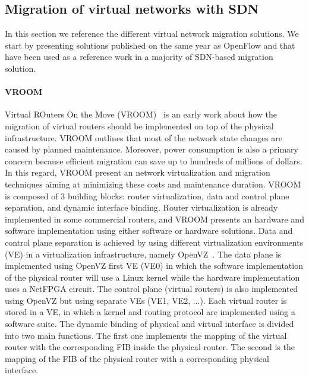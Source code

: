 \subsection{Migration of virtual networks with SDN}
In this section we reference the different virtual network migration solutions.
We start by presenting solutions published on the same year as OpenFlow and that have been used as a reference work in a majority of SDN-based migration solution.

\paragraph{VROOM}
Virtual ROuters On the Move (VROOM)~\cite{VROOM-Wang2008} is an early work about how the migration of virtual routers should be implemented on top of the physical infrastructure. 
VROOM outlines that most of the network state changes are caused by planned maintenance.
Moreover, power consumption is also a primary concern because efficient migration can save up to hundreds of millions of dollars.
In this regard, VROOM present an network virtualization and migration techniques aiming at minimizing these costs and maintenance duration.
VROOM is composed of 3 building blocks: router virtualization, data and control plane separation, and dynamic interface binding.
Router virtualization is already implemented in some commercial routers, and VROOM presents an hardware and software implementation using either software or hardware solutions.
Data and control plane separation is achieved by using different virtualization environments (VE) in a virtualization infrastructure, namely OpenVZ~\cite{openvz}.
The data plane is implemented using OpenVZ first VE (VE0) in which the software implementation of the physical router will use a Linux kernel while the hardware implementation uses a NetFPGA circuit.
The control plane (\ie virtual routers) is also implemented using OpenVZ but using separate VEs (VE1, VE2, ...).
Each virtual router is stored in a VE, in which a kernel and routing protocol are implemented using a software suite.
The dynamic binding of physical and virtual interface is divided into two main functions.
The first one implements the mapping of the virtual router with the corresponding FIB inside the physical router.
The second is the mapping of the FIB of the physical router with a corresponding physical interface.

